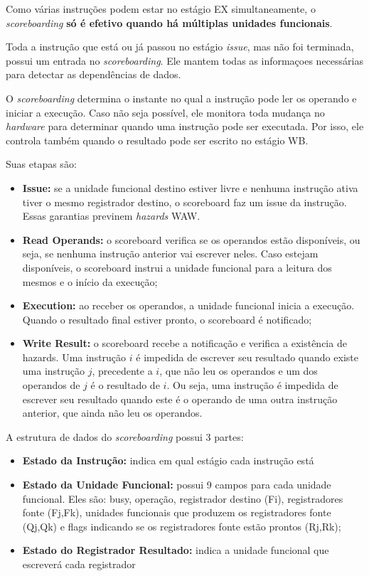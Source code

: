 Como várias instruções podem estar no estágio EX simultaneamente, o \textit{scoreboarding} \textbf{só é efetivo quando há múltiplas unidades funcionais}.

Toda a instrução que está ou já passou no estágio \textit{issue}, mas não foi terminada, possui um entrada no \textit{scoreboarding}. Ele mantem todas as informaçoes necessárias para detectar as dependências de dados.

O \textit{scoreboarding} determina o instante no qual a instrução pode ler os operando e iniciar a execução. Caso não seja possível, ele monitora toda mudança no \textit{hardware} para determinar quando uma instrução pode ser executada. Por isso, ele controla também quando o resultado pode ser escrito no estágio WB.

Suas etapas são:
\begin{itemize}
  \item \textbf{Issue:} se a unidade funcional destino estiver livre e nenhuma instrução ativa tiver o mesmo registrador destino, o scoreboard faz um issue da instrução. Essas garantias previnem \textit{hazards} WAW.

  \item \textbf{Read Operands:} o scoreboard verifica se os operandos estão disponíveis, ou seja, se nenhuma instrução anterior vai escrever neles. Caso estejam disponíveis, o scoreboard instrui a unidade funcional para a leitura dos mesmos e o início da execução;

  \item \textbf{Execution:} ao receber os operandos, a unidade funcional inicia a execução. Quando o resultado final estiver pronto, o scoreboard é notificado;

  \item \textbf{Write Result:} o scoreboard recebe a notificação e verifica a existência de hazards. Uma instrução $i$ é impedida de escrever seu resultado quando existe uma instrução $j$, precedente a $i$, que não leu os operandos e um dos operandos de $j$ é o resultado de $i$. Ou seja, uma instrução é impedida de escrever seu resultado quando este é o operando de uma outra instrução anterior, que ainda não leu os operandos.
\end{itemize}

A estrutura de dados do \textit{scoreboarding} possui 3 partes:
\begin{itemize}
  \item \textbf{Estado da Instrução:} indica em qual estágio cada instrução está

  \item \textbf{Estado da Unidade Funcional:} possui 9 campos para cada unidade funcional. Eles são: busy, operação, registrador destino (Fi), registradores fonte (Fj,Fk), unidades funcionais que produzem os registradores fonte (Qj,Qk) e flags indicando se os registradores fonte estão prontos (Rj,Rk);

  \item \textbf{Estado do Registrador Resultado:} indica a unidade funcional que escreverá cada registrador
\end{itemize}

